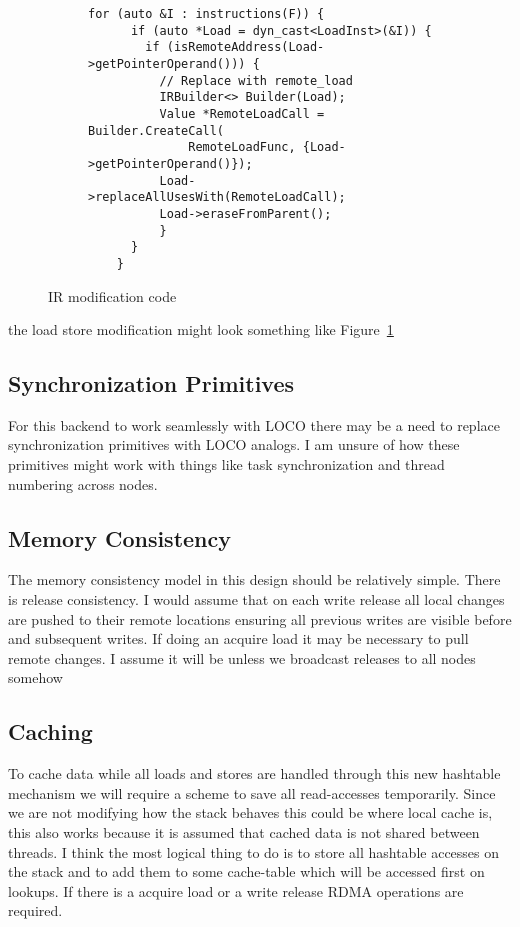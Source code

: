 \documentclass[sigplan,nonacm]{acmart}
\begin{document}
\begin{figure}
    \centering
    \begin{subfigure}{0.45\textwidth}
    \begin{lstlisting}[basicstyle={\ttfamily\scriptsize}]
    for (auto &I : instructions(F)) {
      if (auto *Load = dyn_cast<LoadInst>(&I)) {
        if (isRemoteAddress(Load->getPointerOperand())) {
          // Replace with remote_load
          IRBuilder<> Builder(Load);
          Value *RemoteLoadCall = Builder.CreateCall(
              RemoteLoadFunc, {Load->getPointerOperand()});
          Load->replaceAllUsesWith(RemoteLoadCall);
          Load->eraseFromParent();
          }
      }
    }
    \end{lstlisting}
    \end{subfigure}
    \caption{IR modification code}
    \label{fig:ir-modification}
    \end{figure}

the load store modification might look something like Figure~\ref{fig:ir-modification}



\subsection{Synchronization Primitives}
For this backend to work seamlessly with LOCO there may be a need to replace 
synchronization primitives with LOCO analogs. I am unsure of how these primitives might 
work with things like task synchronization and thread numbering across nodes.


\subsection{Memory Consistency}
The memory consistency model in this design should be relatively simple. There 
is release consistency. I would assume that on each write release all local changes
are pushed to their remote locations ensuring all previous writes are visible before
and subsequent writes. If doing an acquire load it may be necessary to pull remote 
changes. I assume it will be unless we broadcast releases to all nodes somehow


\subsection{Caching}
To cache data while all loads and stores are handled through this new hashtable 
mechanism we will require a scheme to save all read-accesses temporarily. Since 
we are not modifying how the stack behaves this could be where local cache is, this 
also works because it is assumed that cached data is not shared between threads.
I think the most logical thing to do is to store all hashtable accesses on the stack 
and to add them to some cache-table which will be accessed first on lookups. If there 
is a acquire load or a write release RDMA operations are required.
\end{document}
